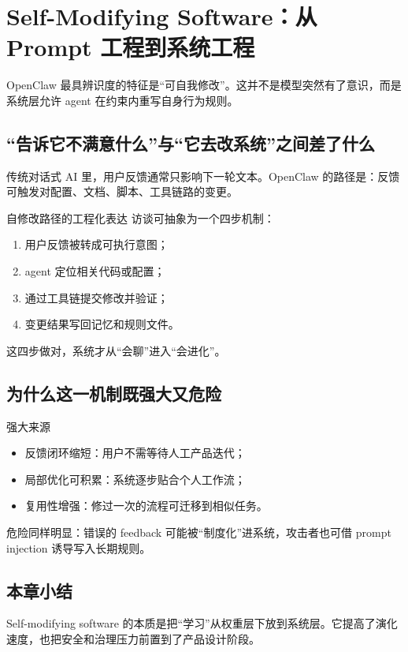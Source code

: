 \section{Self-Modifying Software：从 Prompt 工程到系统工程}

OpenClaw 最具辨识度的特征是“可自我修改”。这并不是模型突然有了意识，而是系统层允许 agent 在约束内重写自身行为规则。

\subsection{“告诉它不满意什么”与“它去改系统”之间差了什么}

传统对话式 AI 里，用户反馈通常只影响下一轮文本。OpenClaw 的路径是：反馈可触发对配置、文档、脚本、工具链路的变更。

\begin{importantbox}{自修改路径的工程化表达}
访谈可抽象为一个四步机制：
\begin{enumerate}
    \item 用户反馈被转成可执行意图；
    \item agent 定位相关代码或配置；
    \item 通过工具链提交修改并验证；
    \item 变更结果写回记忆和规则文件。
\end{enumerate}
这四步做对，系统才从“会聊”进入“会进化”。
\end{importantbox}

\subsection{为什么这一机制既强大又危险}

\begin{knowledgebox}{强大来源}
\begin{itemize}
    \item 反馈闭环缩短：用户不需等待人工产品迭代；
    \item 局部优化可积累：系统逐步贴合个人工作流；
    \item 复用性增强：修过一次的流程可迁移到相似任务。
\end{itemize}
\end{knowledgebox}

危险同样明显：错误的 feedback 可能被“制度化”进系统，攻击者也可借 prompt injection 诱导写入长期规则。

\subsection{本章小结}
Self-modifying software 的本质是把“学习”从权重层下放到系统层。它提高了演化速度，也把安全和治理压力前置到了产品设计阶段。

